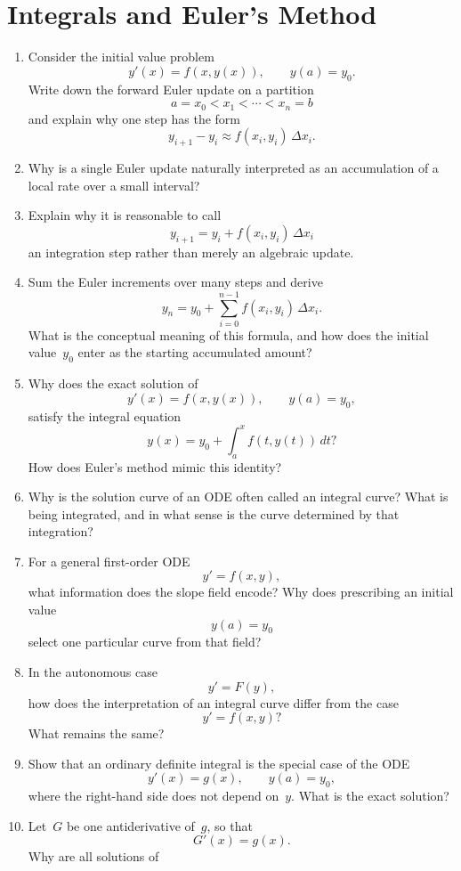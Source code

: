 \section{Integrals and Euler's Method}

\begin{enumerate}
  \item Consider the initial value problem
    \[ y'(x)=f(x,y(x)), \qquad y(a)=y_{0}. \]
    Write down the forward Euler update on a partition
    \[ a=x_{0}<x_{1}<\cdots<x_{n}=b \]
    and explain why one step has the form
    \[ y_{i+1}-y_{i} \approx f(x_{i},y_{i})\,\Delta x_{i}. \]
  \item Why is a single Euler update naturally interpreted as an accumulation of a local rate over a small interval?
  \item Explain why it is reasonable to call
    \[ y_{i+1}=y_{i}+f(x_{i},y_{i})\,\Delta x_{i} \]
    an integration step rather than merely an algebraic update.
  \item Sum the Euler increments over many steps and derive
    \[ y_{n} = y_{0}+\sum_{i=0}^{n-1}f(x_{i},y_{i})\,\Delta x_{i}. \]
    What is the conceptual meaning of this formula, and how does the initial value~\(y_{0}\) enter as the starting accumulated amount?
  \item Why does the exact solution of
    \[ y'(x)=f(x,y(x)), \qquad y(a)=y_{0}, \]
    satisfy the integral equation
    \[ y(x)=y_{0}+\int_{a}^{x} f(t,y(t))\,dt? \]
    How does Euler's method mimic this identity?
  \item Why is the solution curve of an ODE often called an integral curve? What is being integrated, and in what sense is the curve determined by that integration?
  \item For a general first-order ODE
    \[ y'=f(x,y), \]
    what information does the slope field encode? Why does prescribing an initial value
    \[ y(a)=y_{0} \]
    select one particular curve from that field?
  \item In the autonomous case
    \[ y'=F(y), \]
    how does the interpretation of an integral curve differ from the case
    \[ y'=f(x,y)? \]
    What remains the same?
  \item Show that an ordinary definite integral is the special case of the ODE
    \[ y'(x)=g(x), \qquad y(a)=y_{0}, \]
    where the right-hand side does not depend on~\(y\). What is the exact solution?
  \item Let~\(G\) be one antiderivative of~\(g\), so that
    \[ G'(x)=g(x). \]
    Why are all solutions of

\end{enumerate}
